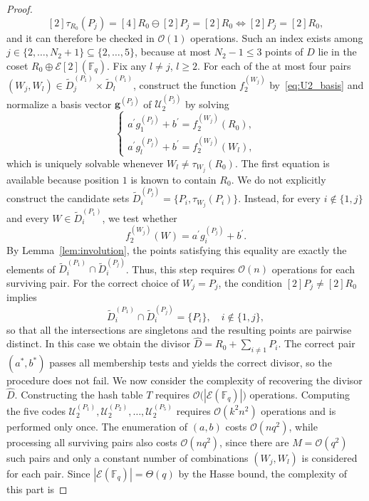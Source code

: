 \documentclass[sn-mathphys-num]{sn-jnl_modified}
\newcommand{\FF}{\ensuremath{\mathbb{F}}}
\begin{document}
\begin{proof}
\[
[2]\tau_{R_0}(P_j)=[4]R_0\ominus[2]P_j=[2]R_0 \iff [2]P_j=[2]R_0,
\]
and it can therefore be checked in $\mathcal{O}(1)$ operations. Such an index exists among $j\in\{2,\dots,N_2+1\}\subseteq\{2,\dots,5\}$, because at most $N_2-1\leq3$ points of $D$ lie in the coset $R_0\oplus\mathcal{E}[2](\FF_q)$.
Fix any $l\neq j$, $l\geq2$. For each of the at most four pairs $(W_j,W_l)\in\widetilde{D}_j^{(P_1)}\times\widetilde{D}_l^{(P_1)}$, construct the function $f_2^{(W_j)}$ by~\eqref{eq:U2_basis} and normalize a basis vector $\mathbf{g}^{(P_j)}$ of $\mathcal{U}_2^{(P_j)}$ by solving
\begin{equation}\label{eq:f_2_system_no_hints}
\begin{cases}
a^\prime g^{(P_j)}_1+b^\prime=f_2^{(W_j)}(R_0),\\
a^\prime g^{(P_j)}_l+b^\prime=f_2^{(W_j)}(W_l),
\end{cases}
\end{equation}
which is uniquely solvable whenever $W_l\neq\tau_{W_j}(R_0)$. The first equation is available because position $1$ is known to contain $R_0$. We do not explicitly construct the candidate sets $\widetilde{D}_i^{(P_j)}=\{P_i,\tau_{W_j}(P_i)\}$. Instead, for every $i \not\in \{1,j\}$ and every $W\in\widetilde{D}_i^{(P_1)}$, we test whether
\begin{equation}\label{eq:cross_check}
f_2^{(W_j)}(W)=a^\prime g^{(P_j)}_i+b^\prime .
\end{equation}
By Lemma~\ref{lem:involution}, the points satisfying this equality are exactly the elements of $\widetilde{D}_i^{(P_1)}\cap\widetilde{D}_i^{(P_j)}$. Thus, this step requires $\mathcal{O}(n)$ operations for each surviving pair.
For the correct choice of $W_j=P_j$, the condition $[2]P_j\neq[2]R_0$ implies
\[
\widetilde{D}_i^{(P_1)}\cap\widetilde{D}_i^{(P_j)}=\{P_i\}, \quad i\not\in\{1,j\},
\]
so that all the intersections are singletons and the resulting points are pairwise distinct. In this case we obtain the divisor $\widehat{D}=R_0+\sum_{i\neq1}P_i$. 
The correct pair $(a^*,b^*)$ passes all membership tests and yields the correct divisor, so the procedure does not fail. We now consider the complexity of recovering the divisor $\widehat{D}$. Constructing the hash table $T$ requires $\mathcal{O}\bigl(|\mathcal{E}(\FF_q)|\bigr)$ operations. Computing the five codes $\mathcal{U}_2^{(P_1)},\mathcal{U}_2^{(P_2)},\dots,\mathcal{U}_2^{(P_5)}$ requires $\mathcal{O}(k^2n^2)$ operations and is performed only once. The enumeration of $(a,b)$ costs $\mathcal{O}(nq^2)$, while processing all surviving pairs also costs $\mathcal{O}(nq^2)$, since there are $M=\mathcal{O}(q^2)$ such pairs and only a constant number of combinations $(W_j,W_l)$ is considered for each pair. Since $|\mathcal{E}(\FF_q)|=\Theta(q)$ by the Hasse bound, the complexity of this part is

\end{proof}
\end{document}
